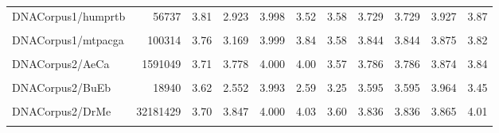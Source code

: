 \documentclass[12pt,twoside]{reedthesis}
\begin{document}
\begin{table}[!h]
{\begin{tabular}[t]{l|r|r|r|r|r|r|r|r|r|r}
\hline
\cellcolor{gray!6}{DNACorpus1/humhdab} & \cellcolor{gray!6}{58864} & \cellcolor{gray!6}{3.86} & \cellcolor{gray!6}{2.934} & \cellcolor{gray!6}{3.998} & \cellcolor{gray!6}{3.56} & \cellcolor{gray!6}{3.61} & \cellcolor{gray!6}{3.727} & \cellcolor{gray!6}{3.727} & \cellcolor{gray!6}{3.938} & \cellcolor{gray!6}{3.97}\\
\hline
DNACorpus1/humprtb & 56737 & 3.81 & 2.923 & 3.998 & 3.52 & 3.58 & 3.729 & 3.729 & 3.927 & 3.87\\
\hline
\cellcolor{gray!6}{DNACorpus1/mpomtcg} & \cellcolor{gray!6}{186609} & \cellcolor{gray!6}{3.68} & \cellcolor{gray!6}{3.218} & \cellcolor{gray!6}{3.999} & \cellcolor{gray!6}{3.84} & \cellcolor{gray!6}{3.50} & \cellcolor{gray!6}{3.682} & \cellcolor{gray!6}{3.682} & \cellcolor{gray!6}{3.896} & \cellcolor{gray!6}{3.76}\\
\hline
DNACorpus1/mtpacga & 100314 & 3.76 & 3.169 & 3.999 & 3.84 & 3.58 & 3.844 & 3.844 & 3.875 & 3.82\\
\hline
\cellcolor{gray!6}{DNACorpus1/vaccg} & \cellcolor{gray!6}{191737} & \cellcolor{gray!6}{3.81} & \cellcolor{gray!6}{3.315} & \cellcolor{gray!6}{3.999} & \cellcolor{gray!6}{3.94} & \cellcolor{gray!6}{3.65} & \cellcolor{gray!6}{3.794} & \cellcolor{gray!6}{3.794} & \cellcolor{gray!6}{3.874} & \cellcolor{gray!6}{3.88}\\
\hline
DNACorpus2/AeCa & 1591049 & 3.71 & 3.778 & 4.000 & 4.00 & 3.57 & 3.786 & 3.786 & 3.874 & 3.84\\
\hline
\cellcolor{gray!6}{DNACorpus2/AgPh} & \cellcolor{gray!6}{43970} & \cellcolor{gray!6}{3.64} & \cellcolor{gray!6}{2.807} & \cellcolor{gray!6}{3.997} & \cellcolor{gray!6}{3.28} & \cellcolor{gray!6}{3.36} & \cellcolor{gray!6}{3.653} & \cellcolor{gray!6}{3.653} & \cellcolor{gray!6}{3.957} & \cellcolor{gray!6}{3.59}\\
\hline
DNACorpus2/BuEb & 18940 & 3.62 & 2.552 & 3.993 & 2.59 & 3.25 & 3.595 & 3.595 & 3.964 & 3.45\\
\hline
\cellcolor{gray!6}{DNACorpus2/DaRe} & \cellcolor{gray!6}{62565020} & \cellcolor{gray!6}{3.88} & \cellcolor{gray!6}{3.928} & \cellcolor{gray!6}{4.000} & \cellcolor{gray!6}{4.39} & \cellcolor{gray!6}{3.76} & \cellcolor{gray!6}{4.013} & \cellcolor{gray!6}{4.013} & \cellcolor{gray!6}{4.035} & \cellcolor{gray!6}{4.99}\\
\hline
DNACorpus2/DrMe & 32181429 & 3.70 & 3.847 & 4.000 & 4.03 & 3.60 & 3.836 & 3.836 & 3.865 & 4.01\\
\hline
\cellcolor{gray!6}{DNACorpus2/EnIn} & \cellcolor{gray!6}{26403087} & \cellcolor{gray!6}{3.72} & \cellcolor{gray!6}{3.918} & \cellcolor{gray!6}{4.000} & \cellcolor{gray!6}{4.14} & \cellcolor{gray!6}{3.61} & \cellcolor{gray!6}{3.893} & \cellcolor{gray!6}{3.893} & \cellcolor{gray!6}{3.928} & \cellcolor{gray!6}{4.56}\\

\end{tabular}}
\end{table}
\end{document}
